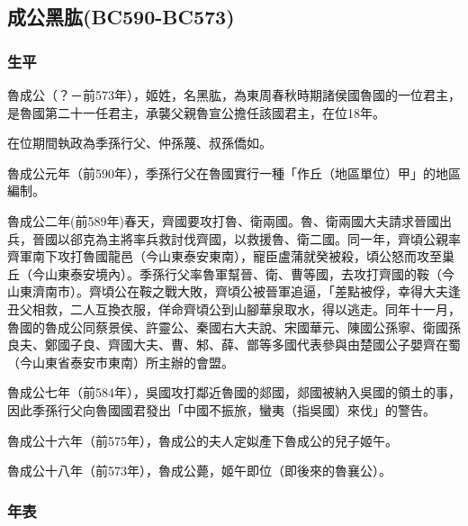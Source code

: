 
\subsection{成公黑肱{\tiny(BC590-BC573)}}

\subsubsection{生平}

魯成公（？－前573年），姬姓，名黑肱，為東周春秋時期諸侯國魯國的一位君主，是魯國第二十一任君主，承襲父親魯宣公擔任該國君主，在位18年。

在位期間執政為季孫行父、仲孫蔑、叔孫僑如。

魯成公元年（前590年），季孫行父在魯國實行一種「作丘（地區單位）甲」的地區編制。

魯成公二年(前589年)春天，齊國要攻打魯、衛兩國。魯、衛兩國大夫請求晉國出兵，晉國以郤克為主將率兵救討伐齊國，以救援魯、衛二國。同一年，齊頃公親率齊軍南下攻打魯國龍邑（今山東泰安東南），寵臣盧蒲就癸被殺，頃公怒而攻至巢丘（今山東泰安境內）。季孫行父率魯軍幫晉、衛、曹等國，去攻打齊國的鞍（今山東濟南市）。齊頃公在鞍之戰大敗，齊頃公被晉軍追逼，「差點被俘，幸得大夫逢丑父相救，二人互換衣服，佯命齊頃公到山腳華泉取水，得以逃走。同年十一月，魯國的魯成公同蔡景侯、許靈公、秦國右大夫說、宋國華元、陳國公孫寧、衛國孫良夫、鄭國子良、齊國大夫、曹、邾、薛、鄫等多國代表參與由楚國公子嬰齊在蜀（今山東省泰安市東南）所主辦的會盟。

魯成公七年（前584年），吳國攻打鄰近魯國的郯國，郯國被納入吳國的領土的事，因此季孫行父向魯國國君發出「中國不振旅，蠻夷（指吳國）來伐」的警告。

魯成公十六年（前575年），魯成公的夫人定姒產下魯成公的兒子姬午。

魯成公十八年（前573年），魯成公薨，姬午即位（即後來的魯襄公）。

\subsubsection{年表}

